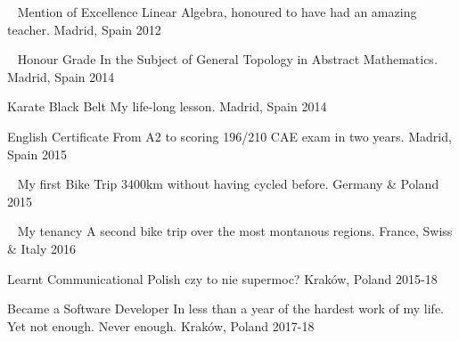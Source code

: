 
\begin{cvhonors}

	\cvhonor
	{\faUniversity \,\,\, Mention of Excellence} %
	{Linear Algebra, honoured to have had an amazing teacher.} %
	{Madrid, Spain} %
	{2012} %
	
	\cvhonor
	{\faUniversity \,\,\, Honour Grade} %
	{In the Subject of General Topology in Abstract Mathematics.} %
	{Madrid, Spain} %
	{2014} %
	
  \cvhonor
    {\faTrophy \quad Karate Black Belt} %
    {My life-long lesson.} %
    {Madrid, Spain} %
    {2014} %

  \cvhonor
    {\faCertificate \quad English Certificate} %
    {From A2 to scoring 196/210 CAE exam in two years.} %
    {Madrid, Spain} %
    {2015} %

  \cvhonor
    {\faBicycle \,\,\, My first Bike Trip} %
    {3400km without having cycled before.} %
    {Germany \& Poland} %
    {2015} %

  \cvhonor
    {\faBicycle \,\,\, My tenancy} %
    {A second bike trip over the most montanous regions.} %
    {France, Swiss \& Italy} %
    {2016} %

\cvhonor
	{\faLanguage \quad Learnt Communicational Polish} %
	{czy to nie supermoc?} %
	{Kraków, Poland} %
	{2015-18} %

  \cvhonor
    {\faLanguage \quad Became a Software Developer} %
    {In less than a year of the hardest work of my life. Yet not enough. Never enough.} %
    {Kraków, Poland} %
    {2017-18} %

\end{cvhonors}

